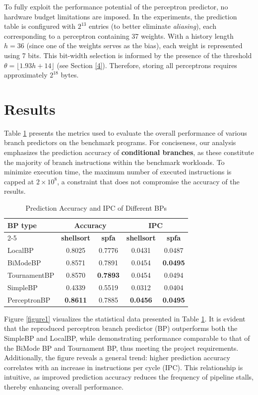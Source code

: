 \documentclass{article}
\begin{document}
To fully exploit the performance potential of the perceptron predictor, no hardware budget limitations are imposed. In the experiments, the prediction table is configured with ${2^{13}}$ entries (to better eliminate \textit{aliasing}), each corresponding to a perceptron containing 37 weights. With a history length ${h = 36}$ (since one of the weights serves as the bias), each weight is represented using 7 bits. This bit-width selection is informed by the presence of the threshold ${\theta= \lfloor 1.93h+14 \rfloor}$ (see Section \ref{4}). Therefore, storing all perceptrons requires approximately ${2^{18}}$ bytes.

\section{Results}
Table \ref{table2} presents the metrics used to evaluate the overall performance of various branch predictors on the benchmark programs. For conciseness, our analysis emphasizes the prediction accuracy of \textbf{conditional branches}, as these constitute the majority of branch instructions within the benchmark workloads. To minimize execution time, the maximum number of executed instructions is capped at $2\times10^8$,  a constraint that does not compromise the accuracy of the results.

\begin{table}[h!]
\centering
\renewcommand{\arraystretch}{1.5}
\begin{tabular}{|l|cc|cc|}
\hline
\multirow{2}{*}{\textbf{BP type}} & \multicolumn{2}{c|}{\textbf{Accuracy}} & \multicolumn{2}{c|}{\textbf{IPC}} \\ 
\cline{2-5}
 & \textbf{shellsort} & \textbf{spfa} & \textbf{shellsort} & \textbf{spfa} \\ 
\hline
LocalBP & 0.8025& 0.7776& 0.0431& 0.0487\\
BiModeBP & 0.8571& 0.7891& 0.0454& \textbf{0.0495}\\
TournamentBP & 0.8570& \textbf{0.7893}& 0.0454& 0.0494\\
SimpleBP& 0.4339& 0.5519& 0.0312& 0.0404\\
PerceptronBP& \textbf{0.8611}& 0.7885& \textbf{0.0456}& \textbf{0.0495}\\
\hline
\end{tabular}
\caption{Prediction Accuracy and IPC of Different BPs}
\label{table2}
\end{table}

Figure \ref{figure1} visualizes the statistical data presented in Table \ref{table2}. It is evident that the reproduced perceptron branch predictor (BP) outperforms both the SimpleBP and LocalBP, while demonstrating performance comparable to that of the BiMode BP and Tournament BP, thus meeting the project requirements. Additionally, the figure reveals a general trend: higher prediction accuracy correlates with an increase in instructions per cycle (IPC). This relationship is intuitive, as improved prediction accuracy reduces the frequency of pipeline stalls, thereby enhancing overall performance.
\end{document}
